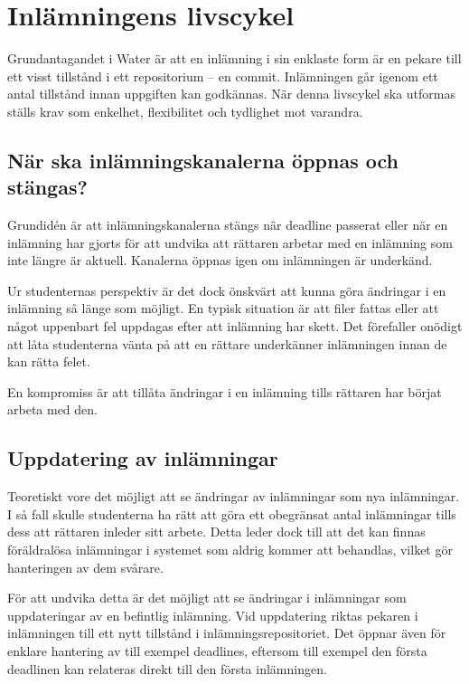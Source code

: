 \section{Inlämningens livscykel}

Grundantagandet i Water är att en inlämning i sin enklaste form är en pekare till ett visst tillstånd i ett repositorium – en commit. Inlämningen går igenom ett antal tillstånd innan uppgiften kan godkännas. När denna livscykel ska utformas ställs krav som enkelhet, flexibilitet och tydlighet mot varandra.

\subsection{När ska inlämningskanalerna öppnas och stängas?}
Grundidén är att inlämningskanalerna stängs när deadline passerat eller när en inlämning har gjorts för att undvika att rättaren arbetar med en inlämning som inte längre är aktuell. Kanalerna öppnas igen om inlämningen är underkänd.

Ur studenternas perspektiv är det dock önskvärt att kunna göra ändringar i en inlämning så länge som möjligt. En typisk situation är att filer fattas eller att något uppenbart fel uppdagas efter att inlämning har skett. Det förefaller onödigt att låta studenterna vänta på att en rättare underkänner inlämningen innan de kan rätta felet.

En kompromiss är att tillåta ändringar i en inlämning tills rättaren har börjat arbeta med den. 

\subsection{Uppdatering av inlämningar}\label{sec:uppdatering-inlamningar}
Teoretiskt vore det möjligt att se ändringar av inlämningar som nya inlämningar. I så fall skulle studenterna ha rätt att göra ett obegränsat antal inlämningar tills dess att rättaren inleder sitt arbete. Detta leder dock till att det kan finnas föräldralösa inlämningar i systemet som aldrig kommer att behandlas, vilket gör hanteringen av dem svårare.

För att undvika detta är det möjligt att se ändringar i inlämningar som uppdateringar av en befintlig inlämning. Vid uppdatering riktas pekaren i inlämningen till ett nytt tillstånd i inlämningsrepositoriet. Det öppnar även för enklare hantering av till exempel deadlines, eftersom till exempel den första deadlinen kan relateras direkt till den första inlämningen.

